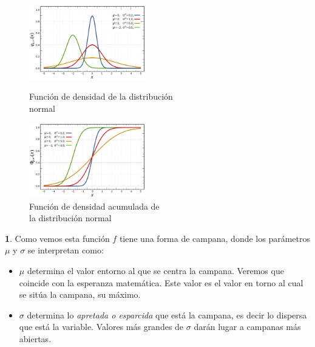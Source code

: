 \documentclass[]{book}
\theoremstyle{plain}
\theoremstyle{definition}
\theoremstyle{definition} %
\newcommand{\thistheoremname}{}
\newtheorem{genericthm}[theorem]{\thistheoremname}
\newenvironment{customdef}[1]
  {\renewcommand{\thistheoremname}{#1}%
   \begin{genericthm}}
  {\end{genericthm}}
\begin{document}
\begin{figure}[htbp]
  \begin{minipage}{0.5\linewidth}
  \centering
  \includegraphics[width=2in,height=\textheight]{img/normal1_new.png}
  \caption{Función de densidad de la distribución\\ normal}
  \end{minipage}%
  \begin{minipage}{0.5\linewidth}
  \centering
  \includegraphics[width=2in,height=\textheight]{img/normal2_new.png}
  \caption{Función de densidad acumulada de \\la distribución normal}
  \end{minipage}

\end{figure} 


\begin{customdef}{Interpretación de $\mu$ y $\sigma$}

Como vemos esta función \(f\) tiene una forma de campana, donde los
parámetros \(\mu\) y \(\sigma\) se interpretan como:

\begin{itemize}
\item
  \(\mu\) determina el valor entorno al que se centra la campana.
  Veremos que coincide con la esperanza matemática. Este valor es el valor en torno al cual se sitúa la campana, su máximo.
\item
  \(\sigma\) determina lo \emph{apretada o esparcida} que está la campana, es decir
  lo dispersa que está la variable. Valores más grandes de $\sigma$ darán lugar a campanas más abiertas.
\end{itemize}

\end{customdef}
\end{document}
